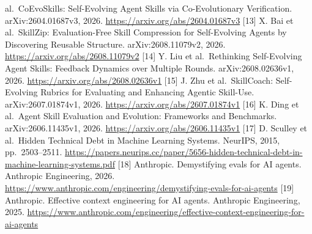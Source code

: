 \documentclass[
  11pt,
]{article}
\begin{document}
al.~CoEvoSkills: Self-Evolving Agent Skills via Co-Evolutionary
Verification. arXiv:2604.01687v3, 2026.
\url{https://arxiv.org/abs/2604.01687v3} {[}13{]} X. Bai et
al.~SkillZip: Evaluation-Free Skill Compression for Self-Evolving Agents
by Discovering Reusable Structure. arXiv:2608.11079v2, 2026.
\url{https://arxiv.org/abs/2608.11079v2} {[}14{]} Y. Liu et
al.~Rethinking Self-Evolving Agent Skills: Feedback Dynamics over
Multiple Rounds. arXiv:2608.02636v1, 2026.
\url{https://arxiv.org/abs/2608.02636v1} {[}15{]} J. Zhu et
al.~SkillCoach: Self-Evolving Rubrics for Evaluating and Enhancing
Agentic Skill-Use. arXiv:2607.01874v1, 2026.
\url{https://arxiv.org/abs/2607.01874v1} {[}16{]} K. Ding et al.~Agent
Skill Evaluation and Evolution: Frameworks and Benchmarks.
arXiv:2606.11435v1, 2026. \url{https://arxiv.org/abs/2606.11435v1}
{[}17{]} D. Sculley et al.~Hidden Technical Debt in Machine Learning
Systems. NeurIPS, 2015, pp.~2503--2511.
\url{https://papers.neurips.cc/paper/5656-hidden-technical-debt-in-machine-learning-systems.pdf}
{[}18{]} Anthropic. Demystifying evals for AI agents. Anthropic
Engineering, 2026.
\url{https://www.anthropic.com/engineering/demystifying-evals-for-ai-agents}
{[}19{]} Anthropic. Effective context engineering for AI agents.
Anthropic Engineering, 2025.
\url{https://www.anthropic.com/engineering/effective-context-engineering-for-ai-agents}
\end{document}
